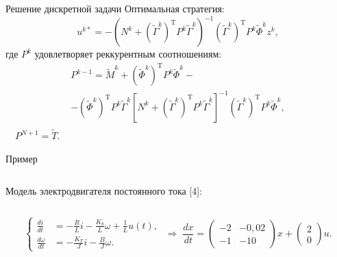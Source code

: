         \begin{frame}{Решение дискретной задачи}
                Оптимальная стратегия:
                $$
                                u^{k*} = -(N^k + (\tilde\Gamma^k)^{\mathrm{T}} P^{k}\tilde\Gamma^k)^{-1}(\tilde\Gamma^k)^{\mathrm{T}} P^{k} \tilde\Phi^k z^k,
                $$
                где $P^k$ удовлетворяет реккурентным соотношениям:
                \begin{multline*}
                        P^{k-1} = \tilde M^k + (\tilde\Phi^k)^{\mathrm{T}}P^k\tilde\Phi^k
                        -\\- (\tilde\Phi^k)^{\mathrm{T}}P^k\tilde\Gamma^k[N^k
                        + (\tilde\Gamma^k)^{\mathrm{T}}P^k\tilde\Gamma^k]^{-1}(\tilde\Gamma^k)^{\mathrm{T}}P^k\tilde\Phi^k, \\
                \end{multline*}
                $
                        \quad P^{N+1} = \tilde T.
                $
        \end{frame}
        \begin{frame}{Пример}
                \begin{columns}
                        \begin{column}{0.4\textwidth}
                                Модель электродвигателя постоянного тока [4]:
                        \end{column}
                        \begin{column}{0.6\textwidth}
                                
                        \end{column}
                \end{columns}
                $$
                        \left\{
                        \begin{aligned}
                        \frac {di}{dt}
                        &=
                        -\frac{R}{L}i
                        -
                        \frac{K_b}{L}\omega
                        +
                        \frac{1}{L}u(t),\\
                        \frac{d\omega}{dt}
                        &=
                        -\frac{K_T}{J}i
                        -
                        \frac{B}{J}\omega.
                        \end{aligned}
                        \right.
                        \;\Longrightarrow\;
                                \frac{dx}{dt}
                                =
                                \begin{pmatrix}
                        -2 & -0,\!02 \\
                        -1 & -10
                                \end{pmatrix}
                                x
                                +
                                \begin{pmatrix}
                        2 \\
                        0
                                \end{pmatrix}
                                u.
                $$
        \end{frame}
